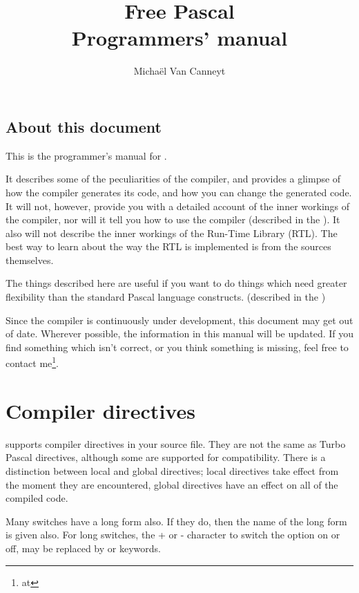 \documentclass{report}
\title{Free Pascal \\ Programmers' manual}
\author{Micha\"el Van Canneyt}
\begin{document}
\maketitle
\tableofcontents
\newpage

\section*{About this document}
This is the programmer's manual for \fpc.

It describes some of the peculiarities of the \fpc compiler, and provides a
glimpse of how the compiler generates its code, and how you can change the
generated code. It will not, however, provide you with a detailed account of
the inner workings of the compiler, nor will it tell you how to use the
compiler (described in the \userref). It also will not describe the inner
workings of the Run-Time Library (RTL). The best way to learn about the way
the RTL is implemented is from the sources themselves.

The things described here are useful if you want to do things which need
greater flexibility than the standard Pascal language constructs.
(described in the )

Since the compiler is continuously under development, this document may get
out of date. Wherever possible, the information in this manual will be
updated. If you find something which isn't correct, or you think something
 is missing, feel free to contact me\footnote{at
}.

\chapter{Compiler directives}
\label{ch:CompSwitch}

\fpc supports compiler directives in your source file. They are not the same
as Turbo Pascal directives, although some are supported for compatibility.
There is a distinction between local and global directives; local directives
take effect from the moment they are encountered, global directives have an
effect on all of the compiled code.

Many switches have a long form also. If they do, then the name of the
long form is given also. For long switches, the + or - character to switch
the option on or off, may be replaced by  or  keywords.
\end{document}
